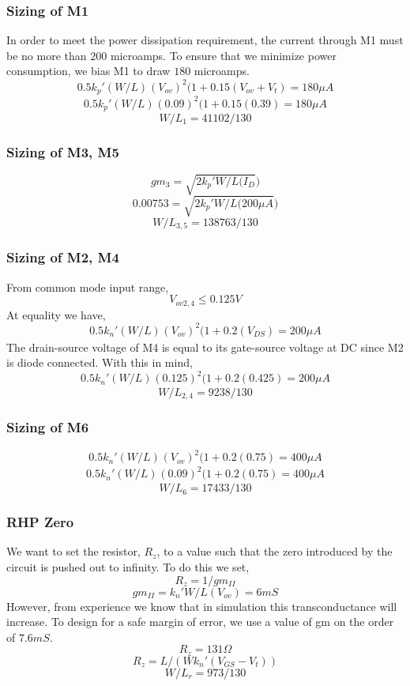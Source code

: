 \documentclass[]{article}
\begin{document}
			\subsubsection{Sizing of M1}
				$$$$
				In order to meet the power dissipation requirement, the current through M1 must be no more than $200$ microamps. To ensure that we minimize power consumption, we bias M1 to draw $180$ microamps.
				$$0.5k_{p}'(W/L)_{}(V_{ov})^2(1+0.15(V_{ov}+V_{t}) = 180 \mu A $$
				$$0.5k_{p}'(W/L)_{}(0.09)^2(1+0.15(0.39) = 180 \mu A $$
				$$W/L_{1} = 41102/130$$
				
			\subsubsection{Sizing of M3, M5}
			$$ gm_{3} = \sqrt{2k_{p}'W/L(I_D}) $$
			$$ 0.00753 = \sqrt{2k_{p}'W/L(200\mu A}) $$
			$$ W/L_{3,5} = 138763/130 $$
			
			\subsubsection{Sizing of M2, M4}
				$$$$
				From common mode input range,
				$$V_{ov2,4} \le 0.125V $$
				At equality we have,
				$$0.5k_{n}'(W/L)_{}(V_{ov})^2(1+0.2(V_{DS}) = 200 \mu A $$
				The drain-source voltage of M4 is equal to its gate-source voltage at DC since M2 is diode connected. With this in mind,
				$$0.5k_{n}'(W/L)_{}(0.125)^2(1+0.2(0.425) = 200 \mu A $$
				$$W/L_{2,4} = 9238/130 $$
			
			\subsubsection{Sizing of M6}
				$$0.5k_{n}'(W/L)_{}(V_{ov})^2(1+0.2(0.75) = 400 \mu A $$
				$$0.5k_{n}'(W/L)_{}(0.09)^2(1+0.2(0.75) = 400 \mu A $$
				$$ W/L_{6} = 17433/130 $$
			
			
			\subsubsection{RHP Zero}
				$$$$
				We want to set the resistor, $R_{z}$, to a value such that the zero introduced by the circuit is pushed out to infinity. To do this we set,
				$$ R_{z} = 1/gm_{II} $$
				$$ gm_{II} = k_{n}'W/L(V_{ov}) = 6 mS $$
				However, from experience we know that in simulation this transconductance will increase. To design for a safe margin of error, we use a value of gm on the order of $7.6mS$.
				$$R_{z} = 131 \Omega$$
				$$R_{z} = L/(Wk_{n}'(V_{GS}-V_{t})) $$
				$$ W/L_{r} = 973/130 $$
			
\end{document}
